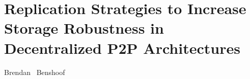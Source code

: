 \chapter{Replication Strategies to Increase Storage Robustness in Decentralized P2P Architectures}
%
%
%
\begin{center}
Brendan ~Benshoof
\end{center}


%
%



%







